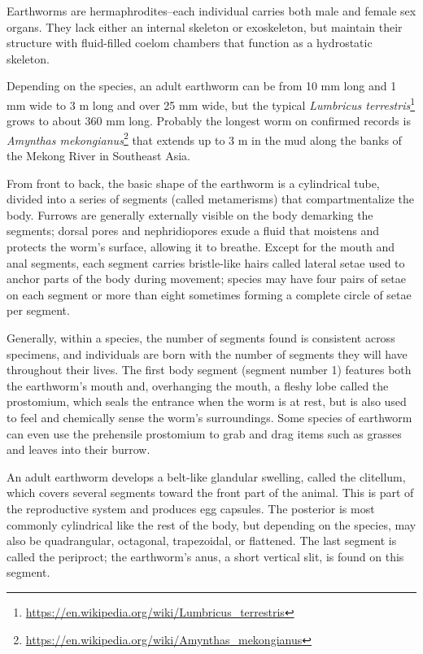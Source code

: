 \documentclass[]{book}
\let\rmarkdownfootnote\footnote%
\def\footnote{\protect\rmarkdownfootnote}
\renewcommand{\href}[2]{#2\footnote{\url{#1}}}
\theoremstyle{definition}
\theoremstyle{definition}
\theoremstyle{definition}
\theoremstyle{remark}
\begin{document}
Earthworms are hermaphrodites--each individual carries both male and
female sex organs. They lack either an internal skeleton or exoskeleton,
but maintain their structure with fluid-filled coelom chambers that
function as a hydrostatic skeleton.

Depending on the species, an adult earthworm can be from 10 mm long and
1 mm wide to 3 m long and over 25 mm wide, but the typical
\href{https://en.wikipedia.org/wiki/Lumbricus_terrestris}{\emph{Lumbricus
terrestris}} grows to about 360 mm long. Probably the longest worm on
confirmed records is
\href{https://en.wikipedia.org/wiki/Amynthas_mekongianus}{\emph{Amynthas
mekongianus}} that extends up to 3 m in the mud along the banks of the
Mekong River in Southeast Asia.

From front to back, the basic shape of the earthworm is a cylindrical
tube, divided into a series of segments (called metamerisms) that
compartmentalize the body. Furrows are generally externally visible on
the body demarking the segments; dorsal pores and nephridiopores exude a
fluid that moistens and protects the worm's surface, allowing it to
breathe. Except for the mouth and anal segments, each segment carries
bristle-like hairs called lateral setae used to anchor parts of the body
during movement; species may have four pairs of setae on each segment or
more than eight sometimes forming a complete circle of setae per
segment.

Generally, within a species, the number of segments found is consistent
across specimens, and individuals are born with the number of segments
they will have throughout their lives. The first body segment (segment
number 1) features both the earthworm's mouth and, overhanging the
mouth, a fleshy lobe called the prostomium, which seals the entrance
when the worm is at rest, but is also used to feel and chemically sense
the worm's surroundings. Some species of earthworm can even use the
prehensile prostomium to grab and drag items such as grasses and leaves
into their burrow.

An adult earthworm develops a belt-like glandular swelling, called the
clitellum, which covers several segments toward the front part of the
animal. This is part of the reproductive system and produces egg
capsules. The posterior is most commonly cylindrical like the rest of
the body, but depending on the species, may also be quadrangular,
octagonal, trapezoidal, or flattened. The last segment is called the
periproct; the earthworm's anus, a short vertical slit, is found on this
segment.
\end{document}
